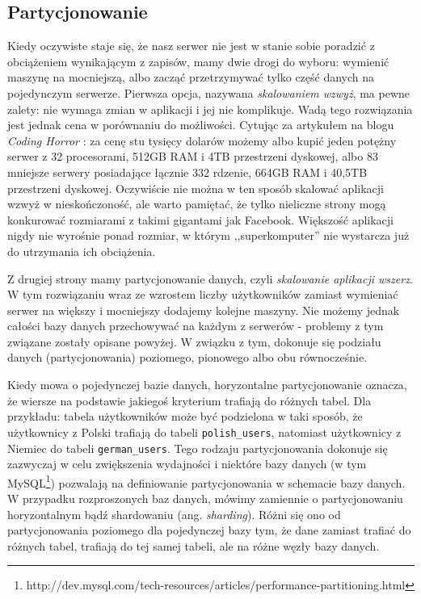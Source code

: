 \subsection{Partycjonowanie}
Kiedy oczywiste staje się, że nasz serwer nie jest w stanie sobie poradzić z obciążeniem wynikającym z zapisów, mamy dwie drogi do wyboru: wymienić maszynę na mocniejszą, albo zacząć przetrzymywać tylko część danych na pojedynczym serwerze.
Pierwsza opcja, nazywana \emph{skalowaniem wzwyż}, ma pewne zalety: nie wymaga zmian w aplikacji i jej nie komplikuje.
Wadą tego rozwiązania jest jednak cena w porównaniu do możliwości.
Cytując za artykułem na blogu \emph{Coding Horror} \cite{codinghorror-scaling-up-vs-out}: za cenę stu tysięcy dolarów możemy albo kupić jeden potężny serwer z 32 procesorami, 512GB RAM i 4TB przestrzeni dyskowej, albo 83 mniejsze serwery posiadające łącznie 332 rdzenie, 664GB RAM i 40,5TB przestrzeni dyskowej.
Oczywiście nie można w ten sposób skalować aplikacji wzwyż w nieskończoność, ale warto pamiętać, że tylko nieliczne strony mogą konkurować rozmiarami z takimi gigantami jak Facebook.
Większość aplikacji nigdy nie wyrośnie ponad rozmiar, w którym ,,superkomputer'' nie wystarcza już do utrzymania ich obciążenia.


Z drugiej strony mamy partycjonowanie danych, czyli \emph{skalowanie aplikacji wszerz}.
W tym rozwiązaniu wraz ze wzrostem liczby użytkowników zamiast wymieniać serwer na większy i mocniejszy dodajemy kolejne maszyny.
Nie możemy jednak całości bazy danych przechowywać na każdym z serwerów - problemy z tym związane zostały opisane powyżej.
W związku z tym, dokonuje się podziału danych (partycjonowania) poziomego, pionowego albo obu równocześnie.

Kiedy mowa o pojedynczej bazie danych, horyzontalne partycjonowanie oznacza, że wiersze na podstawie jakiegoś kryterium trafiają do różnych tabel.
Dla przykładu: tabela użytkowników może być podzielona w taki sposób, że użytkownicy z Polski trafiają do tabeli \verb=polish_users=, natomiast użytkownicy z Niemiec do tabeli \verb=german_users=.
Tego rodzaju partycjonowania dokonuje się zazwyczaj w celu zwiększenia wydajności i niektóre bazy danych (w tym MySQL\footnote{http://dev.mysql.com/tech-resources/articles/performance-partitioning.html}) pozwalają na definiowanie partycjonowania w schemacie bazy danych.
W przypadku rozproszonych baz danych, mówimy zamiennie o partycjonowaniu horyzontalnym bądź shardowaniu (ang. \emph{sharding}).
Różni się ono od partycjonowania poziomego dla pojedynczej bazy tym, że dane zamiast trafiać do różnych tabel, trafiają do tej samej tabeli, ale na różne węzły bazy danych.

